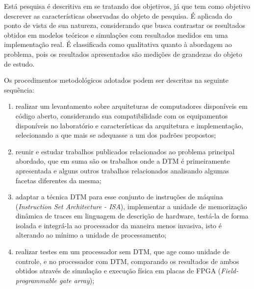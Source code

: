 \label{Metodologia}



Está pesquisa é descritiva em se tratando dos objetivos, já que tem como objetivo descrever as características observadas do objeto de pesquisa. É aplicada do ponto de vista de sua natureza, considerando que busca contrastar os resultados obtidos em modelos teóricos e simulações com resultados medidos em uma implementação real. É classificada como qualitativa quanto à abordagem ao problema, pois os resultados apresentados são medições de grandezas do objeto de estudo.

Os procedimentos metodológicos adotados podem ser descritas na seguinte sequência:

\begin{enumerate}

\item realizar um levantamento sobre arquiteturas de computadores disponíveis em código aberto, considerando sua compatibilidade com os equipamentos disponíveis no laboratório e características da arquitetura e implementação, selecionando a que mais se adequasse a um dos padrões propostos;

\item reunir e estudar trabalhos publicados relacionados ao problema principal abordado, que em suma são os trabalhos onde a DTM é primeiramente apresentada e alguns outros trabalhos relacionados analisando algumas facetas diferentes da mesma;

\item adaptar a técnica DTM para esse conjunto de instruções de máquina (\textit{Instruction Set Architecture - ISA}), implementar a unidade de memorização dinâmica de traces em linguagem de descrição de hardware, testá-la de forma isolada e integrá-la ao processador da maneira menos invasiva, isto é alterando ao mínimo a unidade de processamento; 

\item realizar testes em um processador sem DTM, que age como unidade de controle, e no processador com DTM, comparando os resultados de ambos obtidos através de  simulação e execução física em placas de FPGA (\textit{Field-programmable gate array});

\end{enumerate}

